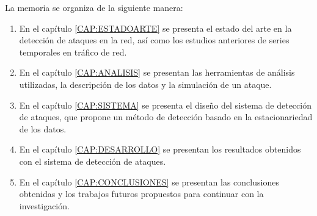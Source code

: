 La memoria se organiza de la siguiente manera:
\begin{enumerate}
    \item En el capítulo \ref{CAP:ESTADOARTE} se presenta el estado del arte en la detección de ataques en la red, así como los estudios anteriores de series temporales en tráfico de red.
    \item En el capítulo \ref{CAP:ANALISIS} se presentan las herramientas de análisis utilizadas, la descripción de los datos y la simulación de un ataque.
    \item En el capítulo \ref{CAP:SISTEMA} se presenta el diseño del sistema de detección de ataques, que propone un método de detección basado en la estacionariedad de los datos.
    \item En el capítulo \ref{CAP:DESARROLLO} se presentan los resultados obtenidos con el sistema de detección de ataques.
    \item En el capítulo \ref{CAP:CONCLUSIONES} se presentan las conclusiones obtenidas y los trabajos futuros propuestos para continuar con la investigación.
\end{enumerate}